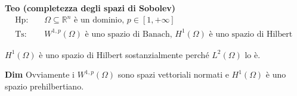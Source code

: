 \documentclass{article}
\begin{document}
\textbf{Teo (completezza degli spazi di Sobolev)}%
\begin{eqnarray*}
\text{Hp}\text{: } &&\Omega \subseteq 
\mathbb{R}
^{n}\text{ \`{e} un dominio, }p\in \left[ 1,+\infty \right] \\
\text{Ts}\text{: } &&W^{1,p}\left( \Omega \right) \text{ \`{e} uno spazio di
Banach, }H^{1}\left( \Omega \right) \text{ \`{e} uno spazio di Hilbert }
\end{eqnarray*}

$H^{1}\left( \Omega \right) $ \`{e} uno spazio di Hilbert sostanzialmente
perch\'{e} $L^{2}\left( \Omega \right) $ lo \`{e}.

\textbf{Dim} Ovviamente i $W^{1,p}\left( \Omega \right) $ sono spazi
vettoriali normati e $H^{1}\left( \Omega \right) $ \`{e} uno spazio
prehilbertiano.
\end{document}
